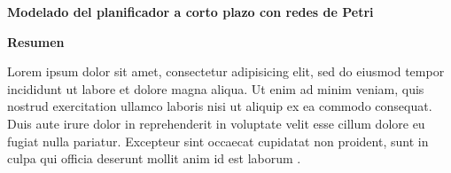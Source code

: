 \thispagestyle{plain}
\begin{center}
    \Large
    \textbf{Modelado del planificador a corto plazo con redes de Petri}

    \large
    \vspace{0.9cm}
    \textbf{Resumen}
\end{center}

Lorem ipsum dolor sit amet, consectetur adipisicing elit, sed do eiusmod tempor incididunt ut labore et dolore magna aliqua. Ut enim ad minim veniam, quis nostrud exercitation ullamco laboris nisi ut aliquip ex ea commodo consequat. Duis aute irure dolor in reprehenderit in voluptate velit esse cillum dolore eu fugiat nulla pariatur. Excepteur sint occaecat cupidatat non proident, sunt in culpa qui officia deserunt mollit anim id est laborum \citep{Feuerriegel2016}.

